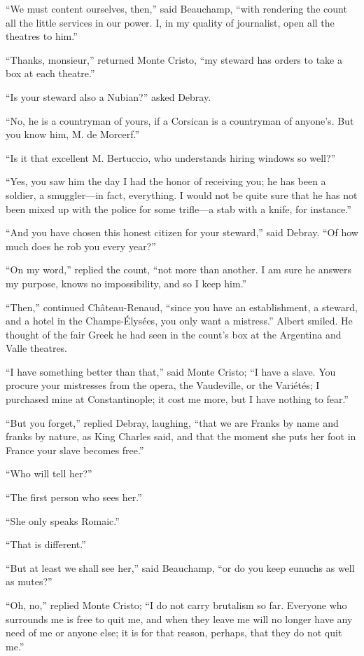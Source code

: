 “We must content ourselves, then,” said Beauchamp, “with rendering the
count all the little services in our power. I, in my quality of
journalist, open all the theatres to him.”

“Thanks, monsieur,” returned Monte Cristo, “my steward has orders to
take a box at each theatre.”

“Is your steward also a Nubian?” asked Debray.

“No, he is a countryman of yours, if a Corsican is a countryman of
anyone’s. But you know him, M. de Morcerf.”

“Is it that excellent M. Bertuccio, who understands hiring windows so
well?”

“Yes, you saw him the day I had the honor of receiving you; he has been
a soldier, a smuggler—in fact, everything. I would not be quite sure
that he has not been mixed up with the police for some trifle—a stab
with a knife, for instance.”

“And you have chosen this honest citizen for your steward,” said
Debray. “Of how much does he rob you every year?”

“On my word,” replied the count, “not more than another. I am sure he
answers my purpose, knows no impossibility, and so I keep him.”

“Then,” continued Château-Renaud, “since you have an establishment, a
steward, and a hotel in the Champs-Élysées, you only want a mistress.”
Albert smiled. He thought of the fair Greek he had seen in the count’s
box at the Argentina and Valle theatres.

“I have something better than that,” said Monte Cristo; “I have a
slave. You procure your mistresses from the opera, the Vaudeville, or
the Variétés; I purchased mine at Constantinople; it cost me more, but
I have nothing to fear.”

“But you forget,” replied Debray, laughing, “that we are Franks by name
and franks by nature, as King Charles said, and that the moment she
puts her foot in France your slave becomes free.”

“Who will tell her?”

“The first person who sees her.”

“She only speaks Romaic.”

“That is different.”

“But at least we shall see her,” said Beauchamp, “or do you keep
eunuchs as well as mutes?”

“Oh, no,” replied Monte Cristo; “I do not carry brutalism so far.
Everyone who surrounds me is free to quit me, and when they leave me
will no longer have any need of me or anyone else; it is for that
reason, perhaps, that they do not quit me.”

